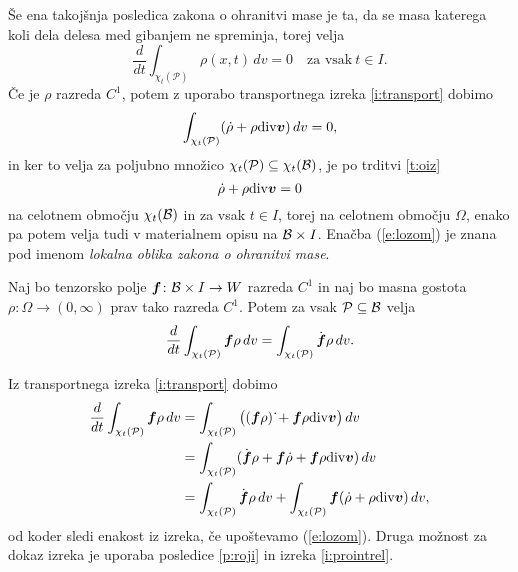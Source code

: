 Še ena takojšnja posledica zakona o ohranitvi mase je ta, da se masa katerega koli
dela delesa med gibanjem ne spreminja, torej velja
\[ \frac{d}{dt}\int_{\chi_t(\mathcal{P})}\rho(x,t)\,dv = 0\quad\textrm{za vsak}\ t\in I. \]
Če je $\rho$ razreda $C^1$, potem z uporabo transportnega izreka \ref{i:transport}
dobimo
\[ \int_{\chi_t(\mathcal{P})}(\dot{\rho}+\rho\mathrm{div}\boldsymbol v)\,dv=0, \]
in ker to velja za poljubno množico $\chi_t(\mathcal{P})\subseteq\chi_t(\mathcal B)$, je po trditvi \ref{t:oiz}
\begin{equation} \label{e:lozom}
	\dot{\rho}+\rho\mathrm{div}\boldsymbol v=0
\end{equation}
na celotnem območju $\chi_t(\mathcal B)$ in za vsak $t\in I$, torej na celotnem območju $\Omega$,
enako pa potem velja tudi v materialnem opisu na $\mathcal B\times I$.
Enačba (\ref{e:lozom}) je znana pod imenom \emph{lokalna oblika zakona o ohranitvi mase}.

\begin{izrek}
	Naj bo tenzorsko polje $\boldsymbol f\colon \mathcal B\times I\to W$ razreda $C^1$ in naj bo masna gostota
	$\rho\colon\Omega\to(0,\infty)$ prav tako razreda $C^1$.
	Potem za vsak $\mathcal{P}\subseteq\mathcal B$ velja
	\[
		\frac{d}{dt}\int_{\chi_t(\mathcal{P})}\boldsymbol f\rho\,dv=
		\int_{\chi_t(\mathcal{P})}\dot{\boldsymbol f}\rho\,dv.
	\]
\end{izrek}
\proof
	Iz transportnega izreka \ref{i:transport} dobimo
	\begin{align*}
		\frac{d}{dt}\int_{\chi_t(\mathcal{P})}\boldsymbol f\rho\,dv
		&= \int_{\chi_t(\mathcal{P})}\big((\boldsymbol f\rho)\,\dot{}+\boldsymbol f\rho\mathrm{div}\boldsymbol v\big)\,dv \\
		&= \int_{\chi_t(\mathcal{P})}(\dot{\boldsymbol f}\rho+\boldsymbol f\dot{\rho}+\boldsymbol f\rho\mathrm{div}\boldsymbol v)\,dv\\
		&= \int_{\chi_t(\mathcal{P})}\dot{\boldsymbol f}\rho\,dv+
		\int_{\chi_t(\mathcal{P})}\boldsymbol f(\dot{\rho}+\rho\mathrm{div}\boldsymbol v)\,dv,
	\end{align*}
	od koder sledi enakost iz izreka, če upoštevamo (\ref{e:lozom}).
\endproof
Druga možnost za dokaz izreka je uporaba posledice \ref{p:roji} in
izreka \ref{i:prointrel}.